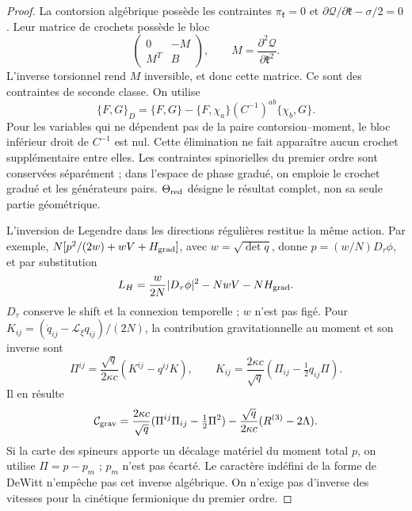 \begin{proof}
La contorsion algébrique possède les contraintes \(\pi_{\mathfrak k}=0\) et \(\partial\mathcal Q/\partial\mathfrak k-\sigma/2=0\). Leur matrice de crochets possède le bloc
\[
 \begin{pmatrix}0&-M\\ M^T&B\end{pmatrix},
 \qquad M=\frac{\partial^2\mathcal Q}{\partial\mathfrak k^2}.
\]
L’inverse torsionnel rend \(M\) inversible, et donc cette matrice. Ce sont des contraintes de seconde classe. On utilise
\begin{equation}
 \{F,G\}_D=\{F,G\}
       -\{F,\chi_a\}(C^{-1})^{ab}\{\chi_b,G\}.
 \label{hmtcuatro:corchete-dirac}
\end{equation}
Pour les variables qui ne dépendent pas de la paire contorsion--moment, le bloc inférieur droit de \(C^{-1}\) est nul. Cette élimination ne fait apparaître aucun crochet supplémentaire entre elles. Les contraintes spinorielles du premier ordre sont conservées séparément ; dans l’espace de phase gradué, on emploie le crochet gradué et les générateurs pairs. \(\Theta_{\rm red}\) désigne le résultat complet, non sa seule partie géométrique.

L’inversion de Legendre dans les directions régulières restitue la même action. Par exemple, \(N[p^2/(2w)+wV+H_{\rm grad}]\), avec \(w=\sqrt{\det q}\), donne \(p=(w/N)D_\tau\phi\), et par substitution
\[
 L_H=\frac{w}{2N}|D_\tau\phi|^2-NwV-NH_{\rm grad}.
\]
\(D_\tau\) conserve le shift et la connexion temporelle ; \(w\) n’est pas figé. Pour \(K_{ij}=(\dot q_{ij}-\mathcal L_\xi q_{ij})/(2N)\), la contribution gravitationnelle au moment et son inverse sont
\begin{equation}
 \Pi^{ij}=\frac{\sqrt q}{2\kappa c}(K^{ij}-q^{ij}K),\qquad
 K_{ij}=\frac{2\kappa c}{\sqrt q}
                  (\Pi_{ij}-\tfrac12q_{ij}\Pi).
 \label{hmtcuatro:legendre-geometrica}
\end{equation}
Il en résulte
\[
 \mathcal C_{\rm grav}
 =\frac{2\kappa c}{\sqrt q}
       (\Pi^{ij}\Pi_{ij}-\tfrac12\Pi^2)
  -\frac{\sqrt q}{2\kappa c}(R^{(3)}-2\Lambda).
\]
Si la carte des spineurs apporte un décalage matériel du moment total \(p\), on utilise \(\Pi=p-p_m\) ; \(p_m\) n’est pas écarté. Le caractère indéfini de la forme de DeWitt n’empêche pas cet inverse algébrique. On n’exige pas d’inverse des vitesses pour la cinétique fermionique du premier ordre.


\end{proof}
